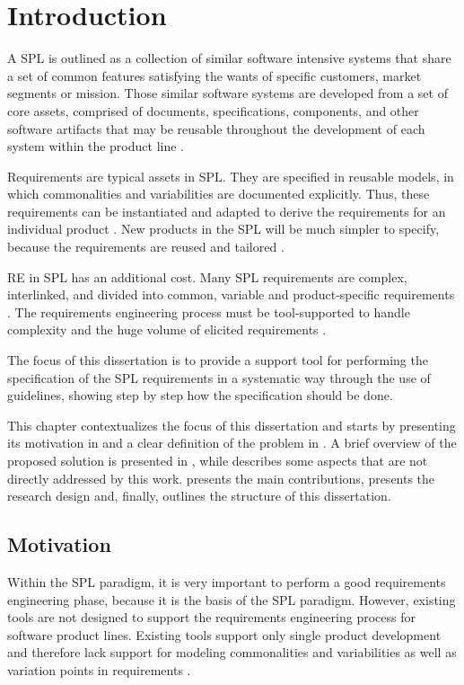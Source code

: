 \chapter{Introduction}
\label{ch:introduction} 
A \acf{SPL} is outlined as a collection of similar software intensive systems
that share a set of common features satisfying the wants of specific customers, market segments 
or mission. Those similar software systems are developed from a set of core assets, comprised of 
documents, specifications, components, and other software artifacts that may be reusable throughout 
the development of each system within the product line
\citep{rafael2013systems}.

Requirements are typical assets in \ac{SPL}. They are specified in reusable models,
in which commonalities and variabilities are documented explicitly. Thus, these 
requirements can be instantiated and adapted to derive the requirements for an 
individual product \citep{cheng2007research}. New products in the SPL will be
much simpler to specify, because the requirements are reused and tailored
\citep{clements2002software}.

\acf{RE} in \ac{SPL} has an additional cost. Many \ac{SPL} requirements are
complex, interlinked, and divided into common, variable and product-specific requirements 
\citep{birk2003report,de2014defining}.  The requirements engineering process
must be tool-supported to handle complexity and the huge volume of elicited requirements
\citep{birk2003report}.

The focus of this dissertation is to provide a support tool for performing the specification of the 
\ac{SPL} requirements in a systematic way through the use of guidelines,  showing step by step how the 
specification should be done.

This chapter contextualizes the focus of this dissertation and starts by
presenting its motivation in  and a clear definition of the problem in 
. A brief overview of the proposed solution is presented in
, while  describes some aspects that
are not directly addressed by this work.
 presents the main contributions,  
 presents the research design  and, finally,
 outlines the structure of this dissertation.

\section{Motivation}
\label{sc:motivation}
Within the \ac{SPL} paradigm, it is very important to perform a good requirements
engineering phase, because it is the basis of the  \ac{SPL} paradigm. However, existing 
tools are not designed to support the requirements engineering process for software 
product lines. Existing tools support only single product development and therefore 
lack support for modeling commonalities and variabilities as well as variation points in 
requirements \citep{birk2003report}.

